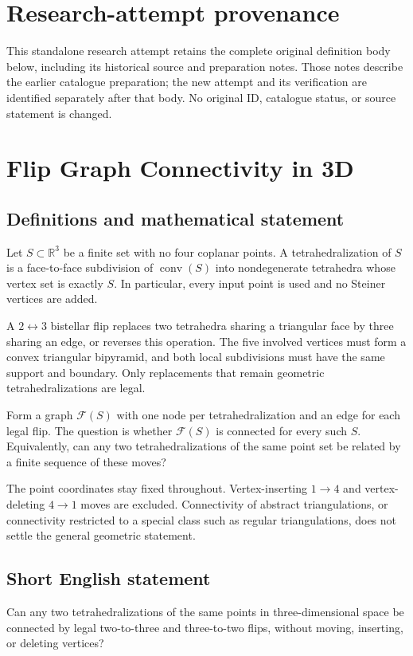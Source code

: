\documentclass[11pt,a4paper]{article}
\begin{document}
\section*{Research-attempt provenance}
This standalone research attempt retains the complete original definition body below,
including its historical source and preparation notes. Those notes describe the
earlier catalogue preparation; the new attempt and its verification are identified
separately after that body. No original ID, catalogue status, or source statement is changed.

\section*{Flip Graph Connectivity in 3D}\label{statement}

\subsection{Definitions and mathematical statement}
Let $S\subset\mathbb R^3$ be a finite set with no four coplanar points.
A tetrahedralization of $S$ is a face-to-face subdivision of
$\operatorname{conv}(S)$ into nondegenerate tetrahedra whose vertex set
is exactly $S$. In particular, every input point is used and no
Steiner vertices are added.

A $2\leftrightarrow3$ bistellar flip replaces two tetrahedra sharing
a triangular face by three sharing an edge, or reverses this operation.
The five involved vertices must form a convex triangular bipyramid,
and both local subdivisions must have the same support and boundary.
Only replacements that remain geometric tetrahedralizations are legal.

Form a graph $\mathcal F(S)$ with one node per tetrahedralization and
an edge for each legal flip. The question is whether $\mathcal F(S)$
is connected for every such $S$. Equivalently, can any two
tetrahedralizations of the same point set be related by a finite
sequence of these moves?

The point coordinates stay fixed throughout. Vertex-inserting
$1\to4$ and vertex-deleting $4\to1$ moves are excluded. Connectivity
of abstract triangulations, or connectivity restricted to a special
class such as regular triangulations, does not settle the general
geometric statement.
\subsection{Short English statement}
Can any two tetrahedralizations of the same points in three-dimensional
space be connected by legal two-to-three and three-to-two flips, without
moving, inserting, or deleting vertices?
\end{document}
